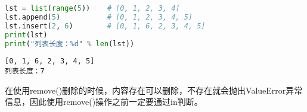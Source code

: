 \begin{table}[H]
	\centering
	\caption{列表操作函数}
\end{table}

\vspace{0.5cm}


\begin{lstlisting}[language=Python]
lst = list(range(5))    # [0, 1, 2, 3, 4]
lst.append(5)           # [0, 1, 2, 3, 4, 5]
lst.insert(2, 6)        # [0, 1, 6, 2, 3, 4, 5]
print(lst)
print("列表长度：%d" % len(lst))
\end{lstlisting}

\begin{tcolorbox}
	\begin{verbatim}
[0, 1, 6, 2, 3, 4, 5]
列表长度：7
\end{verbatim}
\end{tcolorbox}

在使用remove()删除的时候，内容存在可以删除，不存在就会抛出ValueError异常信息，因此使用remove()操作之前一定要通过in判断。\\

